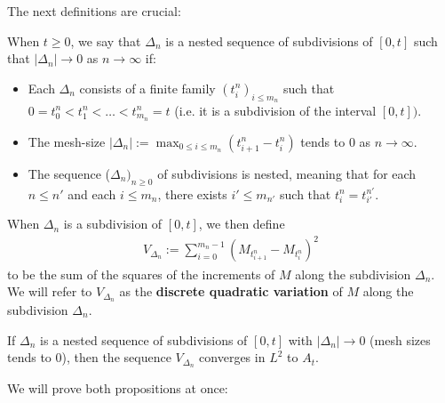 \documentclass[../mainfile.tex]{subfiles}
\begin{document}
\newpage
The next definitions are crucial:
\begin{defn} When $t \geq 0$, we say that $\Delta_n$ is a nested sequence of subdivisions of $[0,t]$ such that $| \Delta_n| \to 0$ as $n \to \infty$ if:
\begin{itemize}
\item Each $\Delta_n$ consists of a finite family $(t_i^n)_{i \leq m_n}$ such that $0=t_0^n < t_1^n < \dots < t_{m_n}^n =t$ (i.e. it is a subdivision of the interval $[0,t])$.
\item The mesh-size $|\Delta_n|:= \max_{0 \leq i \leq m_n} (t_{i+1}^n-t_i^n)$ tends to $0$ as $n \to \infty$. 
\item The sequence ($\Delta_n)_{n \geq 0}$ of subdivisions is nested, meaning that for each $n \leq n'$ and each $i \leq m_n$, there exists $i' \leq m_{n'}$ such that $t_i^n=t_{i'}^{n'}$.
\end{itemize}
\end{defn}
\begin{defn} When $\Delta_n$ is a subdivision of $[0,t]$, we then define 
\begin{align*}
V_{\Delta_n}:= \sum_{i=0}^{m_n-1} (M_{t_{i+1}^n}-M_{t_i^n})^2 
\end{align*}
to be the sum of the squares of the increments of $M$ along the subdivision $\Delta_n$. We will refer to $V_{\Delta_n}$ as the \textbf{discrete quadratic variation} of $M$ along the subdivision $\Delta_n$. 
\end{defn}
\begin{prop} If $\Delta_n$ is a nested sequence of subdivisions of $[0,t]$ with $|\Delta_n| \to 0$ (mesh sizes tends to $0$), then the sequence $V_{\Delta_n}$ converges in $L^2$ to $A_t$. 
\end{prop}
We will prove both propositions at once: 
\end{document}
